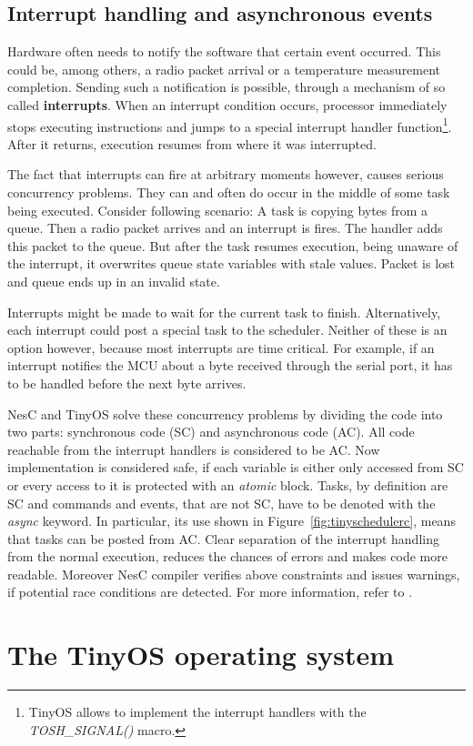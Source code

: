\subsection{Interrupt handling and asynchronous events}
\label{sec:interrupts_and_async}

Hardware often needs to notify the software that certain event
occurred. This could be, among others, a radio packet arrival or a temperature
measurement completion. Sending such a notification is possible,
through a mechanism of so called {\bf interrupts}. When an interrupt
condition occurs, processor immediately stops executing instructions
and jumps to a special interrupt handler function\footnote{TinyOS
allows to implement the interrupt handlers with the
\emph{TOSH\_SIGNAL()} macro.}. After it returns, execution resumes
from where it was interrupted.

The fact that interrupts can fire at arbitrary moments however, causes serious
concurrency problems. They can and often do occur in the middle of
some task being executed.  Consider following scenario: A task is
copying bytes from a queue. Then a radio packet arrives and an interrupt is
fires. The handler adds this packet to the queue. But after the task
resumes execution, being unaware of the interrupt, it overwrites queue
state variables with stale values.  Packet is lost and queue ends up
in an invalid state.

Interrupts might be made to wait for the current task to finish.
Alternatively, each interrupt could post a special task to the
scheduler. Neither of these is an option however, because most
interrupts are time critical. For example, if an interrupt notifies
the MCU about a byte received through the serial port, it has to be
handled before the next byte arrives.

NesC and TinyOS solve these concurrency problems by dividing the code
into two parts: synchronous code (SC) and asynchronous code (AC).  All
code reachable from the interrupt handlers is considered to be AC.
Now implementation is considered safe, if each variable is either only
accessed from SC or every access to it is protected with an
\emph{atomic} block. Tasks, by definition are SC and commands and
events, that are not SC, have to be denoted with the \emph{async}
keyword. In particular, its use shown in
Figure~\ref{fig:tinyschedulerc}, means that tasks can be posted from
AC. Clear separation of the interrupt handling from the normal execution,
reduces the chances of errors and makes code more readable. Moreover  NesC
compiler verifies above constraints and issues warnings, if potential
race conditions are detected. For more information, refer to
\cite[ch. 8]{NesCMan}.

\section{The TinyOS operating system}



\label{haa_arch} %




